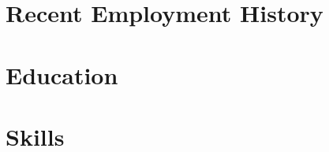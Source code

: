 \documentclass[9pt]{resume}
\begin{document}
\maketitle

\section{Recent Employment History}







\section{Education}


\section{Skills}









\end{document}
